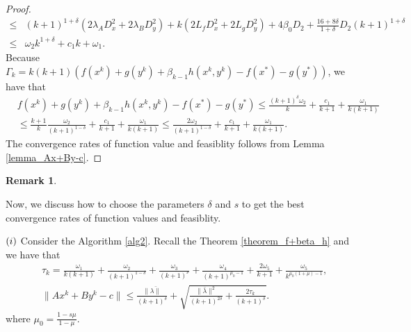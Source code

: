 \documentclass{article}
\numberwithin{equation}{section}
\newtheorem{remark}{Remark}[theorem]
\begin{document}
\begin{proof}
\begin{align}
        \leq& (k+1)^{1+\delta}(2\lambda_{A} D_x^2+ 2\lambda_{B} D_y^2)+ k(2L_fD_x^2+2L_gD_y^2 ) 
        +4\beta_0D_2 + \frac{16+8\delta}{1+\delta}D_2(k+1)^{1+\delta} \nonumber \\ 
        \leq& \omega_2k^{1+\delta} + c_1k + \omega_1.     
    \end{align} 
    Because $\Gamma_k = k(k+1)\left(f(x^k)+ g(y^k)+ \beta_{k-1}h(x^k,y^k) -f(x^*)-g(y^*)\right)$, we have that
    \begin{align}
        &f(x^k) +g(y^k)+\beta_{k-1}h(x^k,y^k) -f(x^*)-g(y^*) \leq \frac{(k+1)^{\delta}\omega_2}{k} + \frac{c_1}{k+1}+\frac{\omega_1}{k(k+1)}  \nonumber\\
        & \leq \frac{k+1}{k}\frac{\omega_2}{(k+1)^{1-\delta}} +\frac{c_1}{k+1} +\frac{\omega_1}{k(k+1)} 
        \leq \frac{2\omega_2}{(k+1)^{1-\delta}} +\frac{c_1}{k+1} +\frac{\omega_1}{k(k+1)}. \label{Fk-F*_leq}
    \end{align}
    The convergence rates of function value and feasiblity follows from Lemma \ref{lemma_Ax+By-c}. 
\end{proof}

\begin{remark}
\end{remark}

Now, we discuss how to choose the parameters $\delta$ and $s$ to get the best convergence rates of 
function values and feasiblity. 

$(\romannumeral1)$ Consider the Algorithm \ref{alg2}. 
Recall the Theorem \ref{theorem_f+beta_h} and we have that 
\begin{align}
    &\tau_k = \frac{\omega_1}{k(k+1)}+ \frac{\omega_2}{(k+1)^{1-\delta}}+ \frac{\omega_3}{(k+1)^{\nu}} 
    + \frac{\omega_4}{(k+1)^{\mu_0-1}}+ \frac{2\omega_5}{k+1}+ \frac{\omega_5}{k^{\mu_0(1+\mu)-1}}, \nonumber \\
    &\|Ax^k+By^k-c\rVert \leq \frac{\|\bar{\lambda\rVert}}{(k+1)^{\delta}}+\sqrt{\frac{\|\bar{\lambda}\rVert^2}{(k+1)^{2\delta}}+\frac{2\tau_k}{(k+1)^{\delta}}}. \nonumber
\end{align}
where $\mu_0 = \frac{1-s\mu}{1-\mu}$. 
\end{document}
